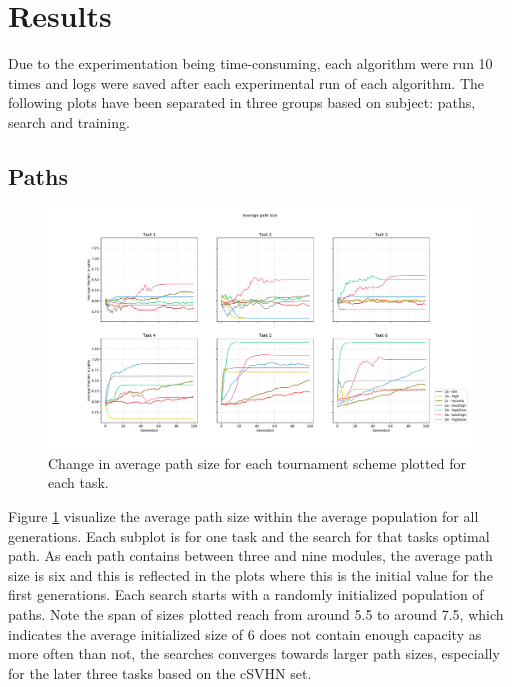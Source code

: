 \section{Results}\label{Search-results}
Due to the experimentation being time-consuming, each algorithm were run 10 times and logs were saved after each experimental run of each algorithm. The following plots have been separated in three groups based on subject: paths, search and training. 

\subsection{Paths}
\begin{figure}[p!]%
    \includegraphics[width=1.2\textwidth,center]{Chapters/Experiments/search_algo/figures/Average_path_size.pdf}
    \caption{Change in average path size for each tournament scheme plotted for each task.}
    \label{fig:search.avg_path_size}
\end{figure}

Figure \ref{fig:search.avg_path_size} visualize the average path size within the average population for all generations. Each subplot is for one task and the search for that tasks optimal path. As each path contains between three and nine modules, the average path size is six and this is reflected in the plots where this is the initial value for the first generations. Each search starts with a randomly initialized population of paths. Note the span of sizes plotted reach from around 5.5 to around 7.5, which indicates the average initialized size of 6 does not contain enough capacity as more often than not, the searches converges towards larger path sizes, especially for the later three tasks based on the cSVHN set. 

